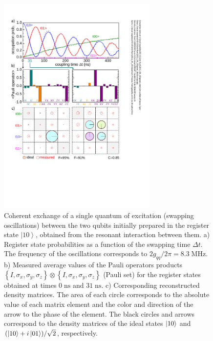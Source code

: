 %
\begin{figure}
\centering \includegraphics[width=0.7\textwidth]{./material/papers/iswap/submission1/Dewes_Figure2}
\caption[Generating entangled two-qubit states by swapping interaction]{Coherent exchange of a single quantum of excitation
(swapping oscillations) between the two qubits initially prepared
in the register state $\left|10\right\rangle $, obtained from the resonant
interaction between them. a) Register state probabilities
as a function of the swapping time $\Delta t$. The frequency of
the oscillations corresponds to $2g_{qq}/2\pi=8.3\;\mathrm{MHz}$. b) Measured
average values of the Pauli operators products $\left\{ I,\sigma_{x},\sigma_{y},\sigma_{z}\right\} \otimes\left\{ I,\sigma_{x},\sigma_{y},\sigma_{z}\right\} $
(Pauli set) for the register states obtained at times $0\;\mathrm{ns}$
and $31\;\mathrm{ns}$. c) Corresponding reconstructed
density matrices. The area of each circle corresponds
to the absolute value of each matrix element and the color and direction
of the arrow to the phase of the element. The black circles and arrows correspond
to the density matrices of the ideal states $\left| 10 \right>$ and $(\left| 10 \right>+i\left| 01 \right>)/\sqrt{2}$,
respectively.}


\label{fig:swap_interaction_state_tomography} %
\end{figure}


